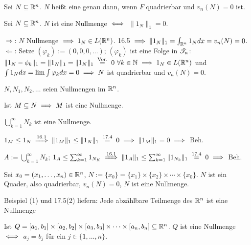 \documentclass[a4paper,twoside,DIV15,BCOR12mm]{scrbook}
\begin{document}
\begin{definition}
Sei $N\subseteq \mathbb{R}^n$. $N$ heißt eine  genau dann, wenn $F$ quadrierbar und $v_n(N) = 0$ ist.
\end{definition}

\begin{satz}
Sei $N\subseteq \mathbb{R}^n$. $N$ ist eine Nullmenge $\iff$ $\|1_N\|_1 = 0 $.
\end{satz}

\begin{beweis}
\glqq$\Rightarrow$\grqq{}: $N$ Nullmenge $\implies 1_N \in L(\mathbb{R}^n)$. 16.5 $\implies \|1_N\|_1 = \int_{\mathbb{R}^n}1_N dx  = v_n(N) = 0$.
\glqq$\Leftarrow$\grqq{}: Setze $(\varphi_k) := (0,0,0,\ldots)$; $(\varphi_k)$ ist eine Folge in $\mathscr{T}_n$: $\|1_N - \phi_k\|_1 = \|1_N\|_1 = \|1_N\|_1 \gleichnach{Vor.} 0 \ \forall k\in\MdN \folgt 1_N \in L(\MdR^n)$ und $\int 1_Ndx = \lim \int \varphi_k dx = 0 \implies N$ ist quadrierbar und $v_n(N)=0$.
\end{beweis} 


\begin{satz}
$N,N_1,N_2,\ldots$ seien Nullmengen im $\mathbb{R}^n$.
\begin{liste}
\item Ist $M\subseteq N \implies M$ ist eine Nullmenge.
\item $\displaystyle\bigcup_{k=1}^\infty N_k$ ist eine Nullmenge.
\end{liste}
\end{satz}

\begin{beweise}
\item $1_M \le 1_N \folgtnach{16.1} \|1_M\|_1 \le \|1_N\|_1 \gleichnach{17.4} 0 \folgt \|1_M\|_1 = 0 \folgt $ Beh.
\item $A:= \bigcup_{k=1}^\infty N_k$; $1_A \le \sum_{k=1}^\infty 1_{N_K} \folgtnach{16.1} \|1_A\|_1 \le \sum_{k=1}^\infty \|1_{N_k}\|_1 \gleichnach{17.4} 0 \folgt$ Beh.
\end{beweise}

\begin{beispiele}
\item Sei $x_0=(x_1,\ldots,x_n)\in\mathbb{R}^n$, $N:=\{x_0\} = \{x_1\}\times\{x_2\}\times\cdots\times\{x_0\}$. $N$ ist ein Quader, also quadrierbar, $v_n(N) = 0$, $N$ ist eine Nullmenge.
\item Beispiel (1) und 17.5(2) liefern: Jede abzählbare Teilmenge des $\mathbb{R}^n$ ist eine Nullmenge %
\item Ist $Q = [a_1,b_1]\times[a_2,b_2]\times[a_3,b_3]\times \cdots \times [a_n,b_n] \subseteq\mathbb{R}^n$. $Q$ ist eine Nullmenge $\iff$ $a_j=b_j$ für ein $j\in\{1,\ldots,n\}$.
\end{beispiele}
\end{document}
